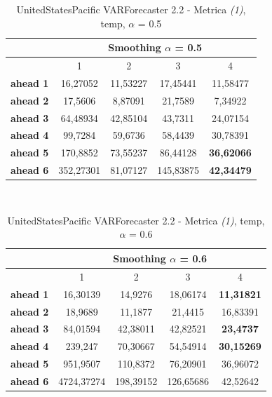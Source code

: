 \documentclass[12pt,a4paper,oneside,openright]{book}
\begin{document}
\medskip

\begin{table}[H]
\centering
\begin{tabular}{|c|c|c|c|c|}
\hline
 & \multicolumn{4}{|c|}{Smoothing $\alpha$ = 0.5} \\
\hline
& 1 & 2 & 3 & 4 \\
\hline
\textbf{ahead 1} & 16,27052 & 11,53227 & 17,45441 & 11,58477 \\
\hline
\textbf{ahead 2} & 17,5606 & 8,87091 & 21,7589 & 7,34922\\ 
\hline
\textbf{ahead 3} & 64,48934 & 42,85104 & 43,7311 & 24,07154 \\
\hline
\textbf{ahead 4} & 99,7284 & 59,6736 & 58,4439 & 30,78391\\ 
\hline
\textbf{ahead 5} & 170,8852 & 73,55237 & 86,44128 & \textbf{36,62066}\\
\hline
\textbf{ahead 6} & 352,27301 & 81,07127 & 145,83875 & \textbf{42,34479}\\ 
\hline
\end{tabular} \\
\caption{UnitedStatesPacific VARForecaster 2.2 - Metrica \textit{(1)}, temp, $\alpha$ = 0.5}
\end{table} 

\medskip

\begin{table}[H]
\centering
\begin{tabular}{|c|c|c|c|c|}
\hline
 & \multicolumn{4}{|c|}{Smoothing $\alpha$ = 0.6} \\
\hline
& 1 & 2 & 3 & 4 \\
\hline
\textbf{ahead 1} & 16,30139 & 14,9276 & 18,06174 & \textbf{11,31821} \\
\hline
\textbf{ahead 2} & 18,9689 & 11,1877 & 21,4415 & 16,83391\\ 
\hline
\textbf{ahead 3} & 84,01594 & 42,38011 & 42,82521 & \textbf{23,4737}\\
\hline
\textbf{ahead 4} & 239,247 & 70,30667 & 54,54914 & \textbf{30,15269}\\ 
\hline
\textbf{ahead 5} & 951,9507 & 110,8372 & 76,20901 & 36,96072\\
\hline
\textbf{ahead 6} & 4724,37274 & 198,39152 & 126,65686 & 42,52642\\ 
\hline
\end{tabular} \\
\caption{UnitedStatesPacific VARForecaster 2.2 - Metrica \textit{(1)}, temp, $\alpha$ = 0.6}
\end{table} 
\end{document}
